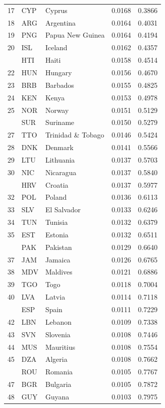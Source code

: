\documentclass[referee,pdflatex,sn-basic]{sn-jnl}
\theoremstyle{thmstylethree}
\begin{document}
\begin{ThreePartTable}
\begin{longtable}[t]{rllrr}
17 & CYP & Cyprus & 0.0168 & 0.3866\\
18 & ARG & Argentina & 0.0164 & 0.4031\\
19 & PNG & Papua New Guinea & 0.0164 & 0.4194\\
20 & ISL & Iceland & 0.0162 & 0.4357\\
\addlinespace
21 & HTI & Haiti & 0.0158 & 0.4514\\
22 & HUN & Hungary & 0.0156 & 0.4670\\
23 & BRB & Barbados & 0.0155 & 0.4825\\
24 & KEN & Kenya & 0.0153 & 0.4978\\
25 & NOR & Norway & 0.0151 & 0.5129\\
\addlinespace
26 & SUR & Suriname & 0.0150 & 0.5279\\
27 & TTO & Trinidad \& Tobago & 0.0146 & 0.5424\\
28 & DNK & Denmark & 0.0141 & 0.5566\\
29 & LTU & Lithuania & 0.0137 & 0.5703\\
30 & NIC & Nicaragua & 0.0137 & 0.5840\\
\addlinespace
31 & HRV & Croatia & 0.0137 & 0.5977\\
32 & POL & Poland & 0.0136 & 0.6113\\
33 & SLV & El Salvador & 0.0133 & 0.6246\\
34 & TUN & Tunisia & 0.0132 & 0.6379\\
35 & EST & Estonia & 0.0132 & 0.6511\\
\addlinespace
36 & PAK & Pakistan & 0.0129 & 0.6640\\
37 & JAM & Jamaica & 0.0126 & 0.6765\\
38 & MDV & Maldives & 0.0121 & 0.6886\\
39 & TGO & Togo & 0.0118 & 0.7004\\
40 & LVA & Latvia & 0.0114 & 0.7118\\
\addlinespace
41 & ESP & Spain & 0.0111 & 0.7229\\
42 & LBN & Lebanon & 0.0109 & 0.7338\\
43 & SVN & Slovenia & 0.0108 & 0.7446\\
44 & MUS & Mauritius & 0.0108 & 0.7554\\
45 & DZA & Algeria & 0.0108 & 0.7662\\
\addlinespace
46 & ROU & Romania & 0.0105 & 0.7767\\
47 & BGR & Bulgaria & 0.0105 & 0.7872\\
48 & GUY & Guyana & 0.0103 & 0.7975\\

\end{longtable}
\end{ThreePartTable}
\end{document}
